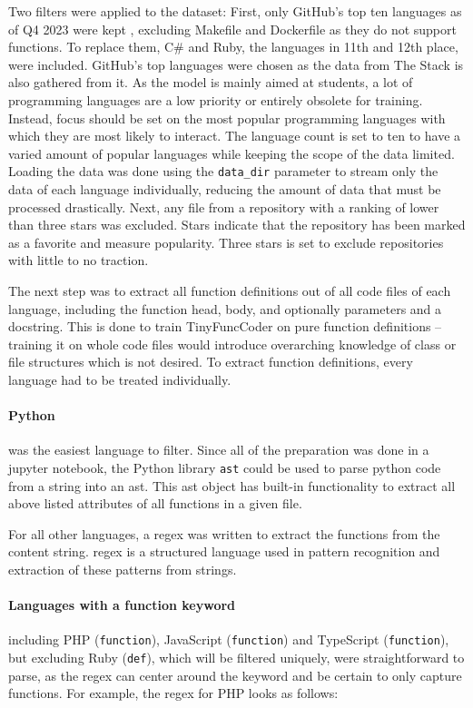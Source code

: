 Two filters were applied to the dataset:
First, only GitHub's top ten languages as of Q4 2023 were kept \cite{GitHub.20240621}, excluding Makefile and Dockerfile as they do not support functions.
To replace them, C\# and Ruby, the languages in 11th and 12th place, were included.
GitHub's top languages were chosen as the data from The Stack is also gathered from it.
As the model is mainly aimed at students, a lot of programming languages are a low priority or entirely obsolete for training.
Instead, focus should be set on the most popular programming languages with which they are most likely to interact.
The language count is set to ten to have a varied amount of popular languages while keeping the scope of the data limited.
Loading the data was done using the \texttt{data\_dir} parameter to stream only the data of each language individually, reducing the amount of data that must be processed drastically.
Next, any file from a repository with a ranking of lower than three stars was excluded.
Stars indicate that the repository has been marked as a favorite and measure popularity.
Three stars is set to exclude repositories with little to no traction.

The next step was to extract all function definitions out of all code files of each language, including the function head, body, and optionally parameters and a docstring.
This is done to train TinyFuncCoder on pure function definitions -- training it on whole code files would introduce overarching knowledge of class or file structures which is not desired.
To extract function definitions, every language had to be treated individually.

\paragraph{Python} was the easiest language to filter.
Since all of the preparation was done in a jupyter notebook, the Python library \texttt{ast} could be used to parse python code from a string into an \ac{ast}.
This \ac{ast} object has built-in functionality to extract all above listed attributes of all functions in a given file.

For all other languages, a \ac{regex} was written to extract the functions from the content string.
\Ac{regex} is a structured language used in pattern recognition and extraction of these patterns from strings.

\paragraph{Languages with a function keyword} including PHP (\texttt{function}), JavaScript (\texttt{function}) and TypeScript (\texttt{function}), but excluding Ruby (\texttt{def}), which will be filtered uniquely, were straightforward to parse, as the \ac{regex} can center around the keyword and be certain to only capture functions.
For example, the \ac{regex} for PHP looks as follows:

